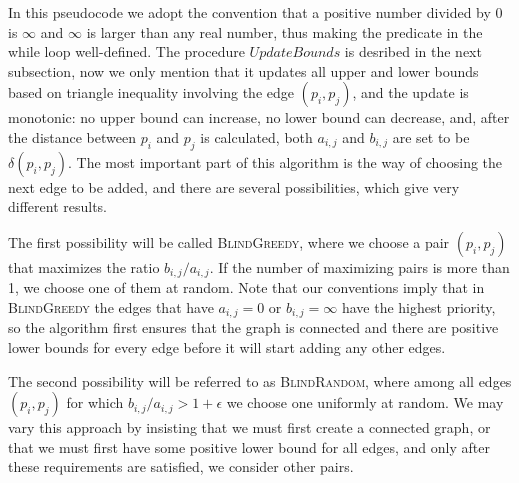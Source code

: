 \documentclass[a4paper,USenglish]{socg-lipics-v2018}
\newcommand{\eps}{\epsilon}
\newcommand{\dist}{\delta}
\begin{document}
\begin{algorithmic}
\label{alg:blind_spanner}
\Function{BlindSpanner}{$P, \eps$}
    \While {$\exists i \neq j : b_{i,j} / a_{i,j} > 1 + \eps$}
    \State {$v \gets \dist(p_i, pj)$}
    \EndWhile
\EndFunction
\end{algorithmic}


In this pseudocode we adopt the convention that a positive number divided by 0 is $\infty$
and $\infty$ is larger than any real number,
thus making the predicate in the while loop well-defined.  The procedure $UpdateBounds$ is desribed in the next subsection,
now we only mention that it updates all upper and lower bounds based on triangle inequality involving the edge $(p_i, p_j)$,
and the update is monotonic: no upper bound can increase, no lower bound can decrease, and, after the distance
between $p_i$ and $p_j$ is calculated, both $a_{i,j}$ and  $b_{i,j}$ are set to be $\dist(p_i, p_j)$.
The most important part of this algorithm is the way of choosing the next edge to be added, and
there are several possibilities, which give very different results.



The first possibility will be called \textsc{BlindGreedy}, where we choose a pair $(p_i, p_j)$ that maximizes
the ratio $b_{i,j} / a_{i,j}$. If the number of maximizing pairs is more than 1, we choose one of them at random.
Note that our conventions imply that in \textsc{BlindGreedy} the edges that have $a_{i,j} = 0$ or $b_{i,j} = \infty$
have the highest priority, so the algorithm first ensures that the graph is connected and there are positive
lower bounds for every edge before it will start adding any other edges.



The second possibility will be referred to as \textsc{BlindRandom}, where among all edges $(p_i, p_j)$
for which $b_{i,j} / a_{i,j} > 1 + \eps$ we choose one uniformly at random. We may vary this approach
by insisting that we must first create a connected graph, or that we must first have some positive lower bound
for all edges, and only after these requirements are satisfied, we consider other pairs.
\end{document}
